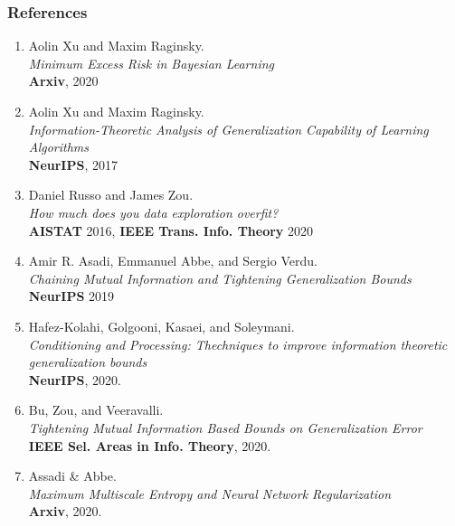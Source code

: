 \documentclass[usenames,dvipsnames, 10pt]{beamer}
\begin{document}
\begin{frame}
	\frametitle{References}
	\begin{scriptsize}
	\begin{enumerate}
		\item Aolin Xu and Maxim Raginsky.\\
		\textit{Minimum Excess Risk in Bayesian Learning}\\
		\textbf{Arxiv}, 2020
		
		\item Aolin Xu and Maxim Raginsky.\\
		\textit{Information-Theoretic Analysis of Generalization Capability of Learning Algorithms}\\
		\textbf{NeurIPS}, 2017\\
		
		\item Daniel Russo and James Zou.\\		
		\textit{How much does you data exploration overfit?}\\
		\textbf{AISTAT} 2016, \textbf{IEEE Trans. Info. Theory} 2020\\
		
		\item  Amir R. Asadi, Emmanuel Abbe, and Sergio Verdu.\\		
		\textit{Chaining Mutual Information and Tightening Generalization Bounds}\\
		\textbf{NeurIPS} 2019
		
		\item Hafez-Kolahi, Golgooni, Kasaei, and Soleymani.\\
		\textit{Conditioning and Processing: Thechniques to improve information theoretic generalization bounds}\\
		\textbf{NeurIPS}, 2020.
		
		\item Bu, Zou, and Veeravalli.\\
		
		\textit{Tightening Mutual Information Based Bounds on Generalization Error}\\		
		\textbf{IEEE Sel. Areas in Info. Theory}, 2020.
		
		
		\item Assadi \& Abbe.\\		
		\textit{Maximum Multiscale Entropy and Neural Network Regularization}\\		
		\textbf{Arxiv}, 2020.
	\end{enumerate}
	\end{scriptsize}
\end{frame}
\end{document}
